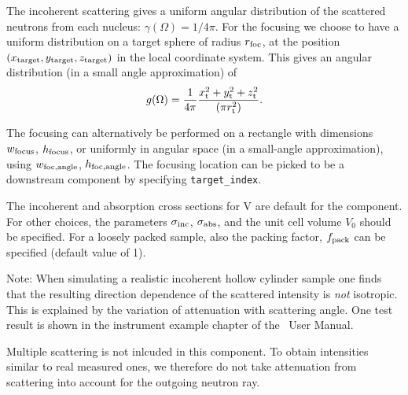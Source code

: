 The incoherent scattering gives
a uniform angular distribution of the scattered
neutrons from each nucleus: $\gamma(\Omega) = 1/4\pi$.
For the focusing we choose to have a uniform distribution on
a target sphere of radius $r_{\rm foc}$, at the position
$(x_{\rm target},y_{\rm target},z_{\rm target})$
in the local coordinate system.
This gives an angular distribution (in a small angle approximation)
of
\begin{equation}
g(\Omega) = \frac{1}{4\pi}
  \frac{x_{\rm t}^2+y_{\rm t}^2+z_{\rm t}^2}{(\pi r_{\rm t}^2)}.
\end{equation}

The focusing can alternatively be performed on a rectangle with dimensions
$w_{\rm focus}$, $h_{\rm focus}$, or uniformly in angular space
(in a small-angle approximation),
using $w_{\rm foc, angle}$, $h_{\rm foc, angle}$.
The focusing location can be picked to be a downstream component by
specifying \verb+target_index+.

The incoherent and absorption cross sections for V are default
for the component. For other choices, the
parameters $\sigma_{\rm inc}$, $\sigma_{\rm abs}$,
and the unit cell volume $V_0$ should be specified.
For a loosely packed sample, also the packing factor, $f_{\rm pack}$
can be specified (default value of 1).

Note: When simulating a realistic incoherent hollow cylinder sample
one finds that  the resulting direction dependence
of the scattered intensity is {\em not} isotropic.
This is explained by the variation of attenuation with
scattering angle.
One test result is shown in the instrument example chapter of the \MCS\ User Manual.

Multiple scattering is not inlcuded in this component. To obtain
intensities similar to real measured ones, we therefore do not 
take attenuation from scattering into account for the outgoing
neutron ray.
